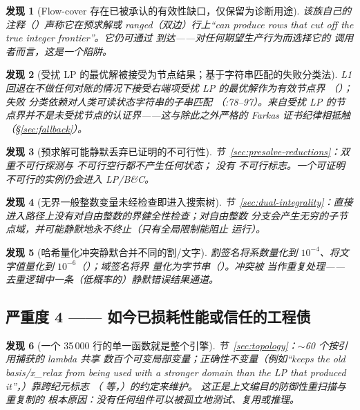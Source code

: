 \documentclass[11pt]{ctexart}
\newtheorem{finding}{发现}
\begin{document}
\begin{finding}[Flow-cover 存在已被承认的有效性缺口，仅保留为诊断用途]
该族自己的注释（）声称它在预求解或
ranged（双边）行上“can
produce rows that cut off the true integer frontier”。它仍可通过  到达——对任何期望生产行为而选择它的
调用者而言，这是一个陷阱。
\end{finding}

\begin{finding}[受扰 LP 的最优解被接受为节点结果；基于字符串匹配的失败分类法]
L1 回退在不做任何对账的情况下接受右端项受扰 LP 的最优解作为有效节点界
（）；失败
分类依赖对人类可读状态字符串的子串匹配
（:78--97）。来自受扰 LP 的节点界\emph{并不是}未受扰节点的认证界——这与除此之外严格的
Farkas 证书纪律相抵触（\S\ref{sec:fallback}）。
\end{finding}

\begin{finding}[预求解可能静默丢弃已证明的不可行性]
节~\ref{sec:presolve-reductions}：双重不可行探测与
不可行空行都不产生任何状态； 没有
不可行标志。一个可证明不可行的实例仍会进入 LP/B\&C。
\end{finding}

\begin{finding}[无界一般整数变量未经检查即进入搜索树]
节~\ref{sec:dual-integrality}：直接进入路径上没有对自由整数的界健全性检查；对自由整数
分支会产生无穷的子节点域，并可能静默地永不终止（只有全局限制能阻止
运行）。
\end{finding}

\begin{finding}[哈希量化冲突静默合并不同的割/文字]
割签名将系数量化到 $10^{-4}$、将文字值量化到
$10^{-6}$（）；域签名将界
量化为字节串（）。冲突被
当作重复处理——去重逻辑中一条（低概率的）静默错误结果通道。
\end{finding}

\subsection{严重度 4 —— 如今已损耗性能或信任的工程债}

\begin{finding}[一个 35\,000 行的单一函数就是整个引擎]
节~\ref{sec:topology}：$\sim$60 个按引用捕获的 lambda 共享
数百个可变局部变量；正确性不变量（例如“keeps the old
basis/x\_relax from being used with a stronger domain than the LP that
produced it”，）靠跨纪元标志
（ 等，）的约定来维护。
这正是上文编目的防御性重扫描与重复制的
根本原因：没有任何组件可以被孤立地测试、复用或推理。
\end{finding}
\end{document}
